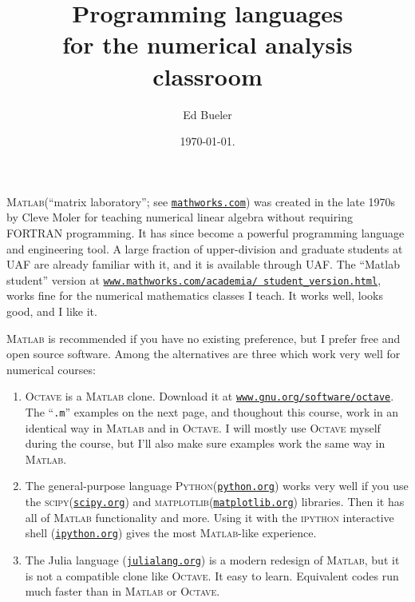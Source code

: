 \documentclass[11pt]{amsart}
\newcommand{\Matlab}{\textsc{Matlab}\xspace}
\newcommand{\Octave}{\textsc{Octave}\xspace}
\newcommand{\Python}{\textsc{Python}\xspace}
\newcommand{\scipy}{\textsc{scipy}\xspace}
\newcommand{\matplotlib}{\textsc{matplotlib}\xspace}
\begin{document}
\title{Programming languages \\ for the numerical analysis classroom}

\author{Ed Bueler}

\date{\today.}

\maketitle
\normalsize
\thispagestyle{empty}

\newcommand{\hrf}[2]{\href{#1}{\texttt{#2}}}

\Matlab (``matrix laboratory''; see \hrf{http://www.mathworks.com/}{mathworks.com}) was created in the late 1970s by Cleve Moler for teaching numerical linear algebra without requiring FORTRAN programming.  It has since become a powerful programming language and engineering tool.  A large fraction of upper-division and graduate students at UAF are already familiar with it, and it is available through UAF.  The ``Matlab student'' version at \hrf{https://www.mathworks.com/academia/student_version.html}{\texttt{www.mathworks.com/academia/ student\_version.html}}, works fine for the numerical mathematics classes I teach.  It works well, looks good, and I like it.

\Matlab is recommended if you have no existing preference, but I prefer free and open source software.  Among the alternatives are three which work very well for numerical courses:
\renewcommand{\labelenumi}{\arabic{enumi}.}
\begin{enumerate}
\item \Octave is a \Matlab clone.  Download it at
\hrf{http://www.gnu.org/software/octave/}{www.gnu.org/software/octave}.  The ``\texttt{.m}'' examples on the next page, and thoughout this course, work in an identical way in \Matlab and in \Octave.  I will mostly use \Octave myself during the course, but I'll also make sure examples work the same way in \Matlab.
\item The general-purpose language \Python (\hrf{http://python.org/}{python.org}) works very well if you use the \scipy (\hrf{http://www.scipy.org/}{scipy.org}) and \matplotlib (\hrf{http://matplotlib.org/}{matplotlib.org}) libraries.  Then it has all of \Matlab functionality and more.  Using it with the \textsc{ipython} interactive shell (\hrf{http://ipython.org/}{ipython.org}) gives the most \Matlab-like experience.
\item The Julia language (\hrf{https://julialang.org/}{julialang.org}) is a modern redesign of \Matlab, but it is not a compatible clone like \Octave.  It easy to learn.  Equivalent codes run much faster than in \Matlab or \Octave.
\end{enumerate}
\end{document}
